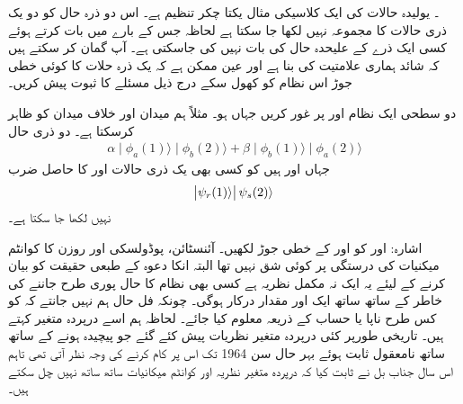 ۔ یولیدہ حالات کی ایک کلاسیکی مثال یکتا چکر تنظیم  ہے۔ اس دو ذرہ حال کو دو یک ذری حالات کا مجموعہ نہیں لکھا جا سکتا ہے لحاظہ جس کے بارے میں بات کرتے ہوئے کسی ایک ذرے کے علیحدہ حال کی بات نہیں کی جاسکتی ہے۔ آپ گمان کر سکتے ہیں کہ شائد ہماری علامتیت کی بنا ہے اور عین ممکن ہے کہ یک ذرہ حلات کا کوئی خطی جوڑ اس نظام کو کھول سکے درج ذیل مسئلے کا ثبوت پیش کریں۔

دو سطحی ایک نظام  اور  پر غور کریں جہاں  ہو۔ مثلاً  ہم میدان اور  خلاف میدان کو ظاہر کرسکتا ہے۔ دو ذری حال 
\begin{align*}
	\alpha\mid\phi_a(1)\rangle\mid\phi_b(2)\rangle+\beta\mid\phi_b(1)\rangle\mid\phi_a(2)\rangle
\end{align*}
جہاں  اور  ہیں کو کسی بھی یک ذری حالات  اور  کا حاصل ضرب
\begin{align*}
	\abs{\psi_r(1)\rangle}\psi_s(2)\rangle
\end{align*}
نہیں لکھا جا سکتا ہے۔

اشارہ:  اور  کو  اور  کے خطی جوڑ لکھیں۔
آئنسٹائن، پوڈولسکی اور روزن کا کوانٹم میکنیات کی درستگی پر کوئی شق نہیں تھا البتہ انکا دعوہ کے طبعی حقیقت کو بیان کرنے کے لیئے یہ ایک نہ مکمل نظریہ ہے کسی بھی نظام کا حال پوری طرح جاننے کی خاطر  کے ساتھ ساتھ ایک اور مقدار  درکار ہوگی۔ چونکہ فل حال ہم نہیں جانتے کہ  کو کس طرح ناپا یا حساب کے ذریعہ معلوم کیا جائے۔ لحاظہ ہم اسے درپردہ متغیر کہتے ہیں۔ تاریخی طورپر کئی درپردہ متغیر نظریات پیش کئے گئے جو پیچیدہ ہونے کے ساتھ ساتھ نامعقول ثابت ہوئے بہر حال سن \num{1964} تک اس پر کام کرنے کی وجہ نظر آتی تھی تاہم اس سال جناب بل نے ثابت کیا کہ درپردہ متغیر نظریہ اور کوانٹم میکانیات ساتھ ساتھ نہیں چل سکتے ہیں۔

